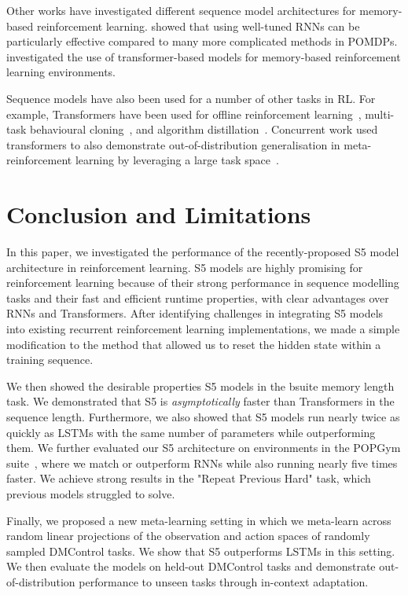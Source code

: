 \documentclass{article}
\begin{document}
Other works have investigated different sequence model architectures for memory-based reinforcement learning. \citet{ni2022recurrent} showed that using well-tuned RNNs can be particularly effective compared to many more complicated methods in POMDPs. \citet{parisotto2020stabilizing} investigated the use of transformer-based models for memory-based reinforcement learning environments.

Sequence models have also been used for a number of other tasks in RL. For example, Transformers have been used for offline reinforcement learning~\citep{chen2021decision}, multi-task behavioural cloning~\citep{reed2022generalist}, and algorithm distillation~\citep{laskin2022context}. Concurrent work used transformers to also demonstrate out-of-distribution generalisation in meta-reinforcement learning by leveraging a large task space~\citep{ada2023ada}. 

\section{Conclusion and Limitations}

In this paper, we investigated the performance of the recently-proposed S5 model architecture in reinforcement learning. S5 models are highly promising for reinforcement learning because of their strong performance in sequence modelling tasks and their fast and efficient runtime properties, with clear advantages over RNNs and Transformers. After identifying challenges in integrating S5 models into existing recurrent reinforcement learning implementations, we made a simple modification to the method that allowed us to reset the hidden state within a training sequence. 

We then showed the desirable properties S5 models in the bsuite memory length task. We demonstrated that S5 is \textit{asymptotically} faster than Transformers in the sequence length. Furthermore, we also showed that S5 models run nearly twice as quickly as LSTMs with the same number of parameters while outperforming them. We further evaluated our S5 architecture on environments in the POPGym suite~\citep{morad2023popgym}, where we match or outperform RNNs while also running nearly five times faster. We achieve strong results in the "Repeat Previous Hard" task, which previous models struggled to solve.

Finally, we proposed a new meta-learning setting in which we meta-learn across random linear projections of the observation and action spaces of randomly sampled DMControl tasks. We show that S5 outperforms LSTMs in this setting. We then evaluate the models on held-out DMControl tasks and demonstrate out-of-distribution performance to unseen tasks through in-context adaptation. 
 
\end{document}
